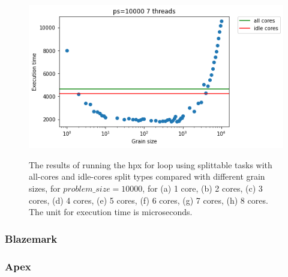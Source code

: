 \begin{figure}[H]
	{\centering\includegraphics[scale=.35]{images/hpx_for_loop/splittable/all_idle_cores/marvin_10000_7.png}	
		\label{fig66:g}}
	\hfill
	\caption{The results of running the hpx for loop using splittable tasks with all-cores and idle-cores split types compared with different grain sizes, for $problem\_size=10000$, for (a) 1 core, (b) 2 cores, (c) 3 cores, (d) 4 cores, (e) 5 cores, (f) 6 cores, (g) 7 cores, (h) 8 cores. The unit for execution time is microseconds.}
	\label{fig66}	
\end{figure}

\subsubsection{Blazemark}

\subsubsection{Apex}
